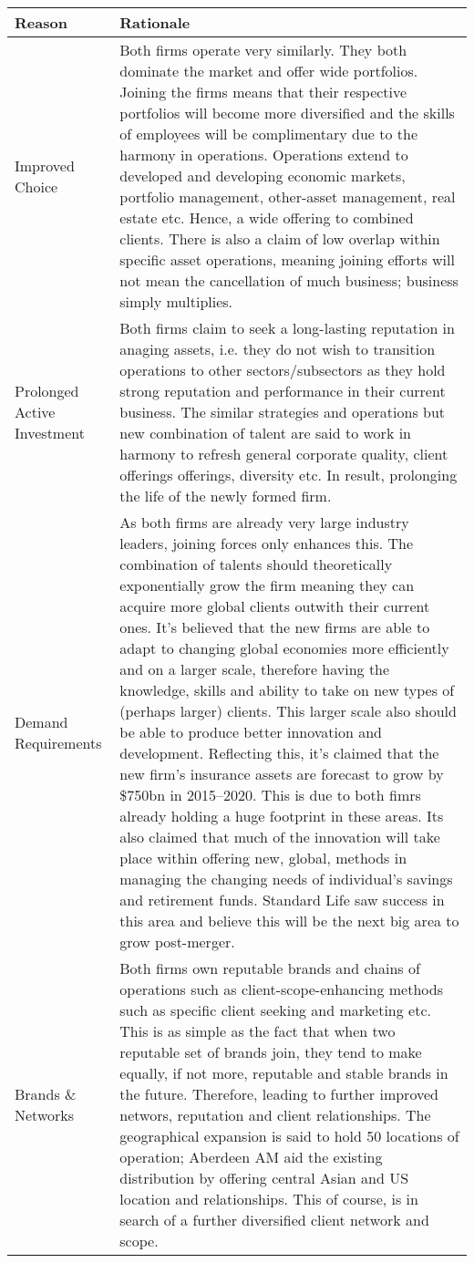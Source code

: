\documentclass[11pt, english]{article}
\begin{document}
\begin{center}
        \scriptsize
\begin{longtable}{p{4cm}p{8.5cm}}
        \textbf{Reason} & \textbf{Rationale}\\
        \hline  
        Improved Choice & Both firms operate very similarly. They both dominate the market and offer wide portfolios. Joining the firms means that their respective portfolios will become more diversified and the skills of employees will be complimentary due to the harmony in operations. Operations extend to developed and developing economic markets, portfolio management, other-asset management, real estate etc. Hence, a wide offering to combined clients. There is also a claim of low overlap within specific asset operations, meaning joining efforts will not mean the cancellation of much business; business simply multiplies.\\
        Prolonged Active Investment & Both firms claim to seek a long-lasting reputation in anaging assets, i.e. they do not wish to transition operations to other sectors/subsectors as they hold strong reputation and performance in their current business. The similar strategies and operations but new combination of talent are said to work in harmony to refresh general corporate quality, client offerings offerings, diversity etc. In result, prolonging the life of the newly formed firm.\\
        Demand Requirements & As both firms are already very large industry leaders, joining forces only enhances this. The combination of talents should theoretically exponentially grow the firm meaning they can acquire more global clients outwith their current ones. It's believed that the new firms are able to adapt to changing global economies more efficiently and on a larger scale, therefore having the knowledge, skills and ability to take on new types of (perhaps larger) clients. This larger scale also should be able to produce better innovation and development. Reflecting this, it's claimed that the new firm's insurance assets are forecast to grow by \$750bn in 2015--2020. This is due to both fimrs already holding a huge footprint in these areas. Its also claimed that much of the innovation will take place within offering new, global, methods in managing the changing needs of individual's savings and retirement funds. Standard Life saw success in this area and believe this will be the next big area to grow post-merger.\\
        Brands \& Networks & Both firms own reputable brands and chains of operations such as client-scope-enhancing methods such as specific client seeking and marketing etc. This is as simple as the fact that when two reputable set of brands join, they tend to make equally, if not more, reputable and stable brands in the future. Therefore, leading to further improved networs, reputation and client relationships. The geographical expansion is said to hold 50 locations of operation; Aberdeen AM aid the existing distribution by offering central Asian and US location and relationships. This of course, is in search of a further diversified client network and scope.\\

\end{longtable}
\end{center}
\end{document}
